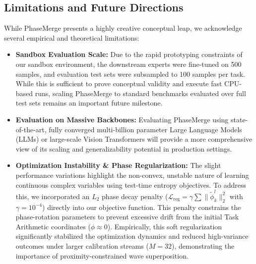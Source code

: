\subsection{Limitations and Future Directions}
While PhaseMerge presents a highly creative conceptual leap, we acknowledge several empirical and theoretical limitations:
\begin{itemize}
    \item \textbf{Sandbox Evaluation Scale:} Due to the rapid prototyping constraints of our sandbox environment, the downstream experts were fine-tuned on 500 samples, and evaluation test sets were subsampled to 100 samples per task. While this is sufficient to prove conceptual validity and execute fast CPU-based runs, scaling PhaseMerge to standard benchmarks evaluated over full test sets remains an important future milestone.
    \item \textbf{Evaluation on Massive Backbones:} Evaluating PhaseMerge using state-of-the-art, fully converged multi-billion parameter Large Language Models (LLMs) or large-scale Vision Transformers will provide a more comprehensive view of its scaling and generalizability potential in production settings.
    \item \textbf{Optimization Instability \& Phase Regularization:} The slight performance variations highlight the non-convex, unstable nature of learning continuous complex variables using test-time entropy objectives. To address this, we incorporated an $L_2$ phase decay penalty ($\mathcal{L}_{\text{reg}} = \gamma \sum \|\tilde{\phi}_k^l\|_2^2$ with $\gamma = 10^{-4}$) directly into our objective function. This penalty constrains the phase-rotation parameters to prevent excessive drift from the initial Task Arithmetic coordinates ($\phi \approx 0$). Empirically, this soft regularization significantly stabilized the optimization dynamics and reduced high-variance outcomes under larger calibration streams ($M=32$), demonstrating the importance of proximity-constrained wave superposition.
\end{itemize}
